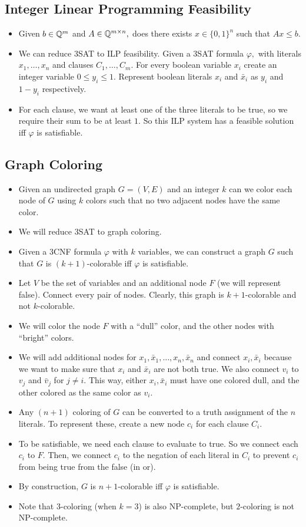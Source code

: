 \documentclass[a4paper,12pt]{article}
\begin{document}
\subsection{Integer Linear Programming Feasibility}
\begin{itemize}
    \item Given $b\in\mathbb{Q}^m$ and $A\in\mathbb{Q}^{m\times n},$ does there exists $x\in\{0,1\}^n$ such that $Ax\leq b.$
    \item We can reduce 3SAT to ILP feasibility. Given a 3SAT formula $\varphi,$ with literals $x_1,\ldots,x_n$ and clauses $C_1,\ldots,C_m.$ For every boolean variable $x_i$ create an integer variable $0\leq y_i\leq 1.$ Represent boolean literals $x_i$ and $\bar x_i$ as $y_i$ and $1-y_i$ respectively. 
    \item For each clause, we want at least one of the three literals to be true, so we require their sum to be at least $1.$ So this ILP system has a feasible solution iff $\varphi$ is satisfiable.
\end{itemize}
\subsection{Graph Coloring}
\begin{itemize}
    \item Given an undirected graph $G=(V,E)$ and an integer $k$ can we color each node of $G$ using $k$ colors such that no two adjacent nodes have the same color.
    \item We will reduce 3SAT to graph coloring. 
    \item Given a 3CNF formula $\varphi$ with $k$ variables, we can construct a graph $G$ such that $G$ is $(k+1)$-colorable iff $\varphi$ is satisfiable.
    \item Let $V$ be the set of variables and an additional node $F$ (we will represent false). Connect every pair of nodes. Clearly, this graph is $k+1$-colorable and not $k$-colorable.
    \item We will color the node $F$ with a ``dull'' color, and the other nodes with ``bright'' colors.
    \item We will add additional nodes for $x_1,\bar x_1,\ldots,x_n,\bar x_n$ and connect $x_i,\bar x_i$ because we want to make sure that $x_i$ and $\bar x_i$ are not both true. We also connect $v_i$ to $v_j$ and $\bar v_j$ for $j\neq i.$ This way, either $x_i,\bar x_i$ must have one colored dull, and the other colored as the same color as $v_i.$
    \item Any $(n+1)$ coloring of $G$ can be converted to a truth assignment of the $n$ literals. To represent these, create a new node $c_i$ for each clause $C_i.$
    \item To be satisfiable, we need each clause to evaluate to true. So we connect each $c_i$ to $F.$ Then,  we connect $c_i$ to the negation of each literal in $C_i$ to prevent $c_i$ from being true from the false (in or).
    \item By construction, $G$ is $n+1$-colorable iff $\varphi$ is satisfiable.
    \item Note that $3$-coloring (when $k=3$) is also NP-complete, but $2$-coloring is not NP-complete.
\end{itemize}
\end{document}
